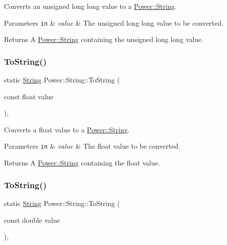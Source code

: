 Converts an unsigned long long value to a \hyperlink{class_power_1_1_string}{Power\+::\+String}. 


\begin{DoxyParams}[1]{Parameters}
\mbox{\tt in}  & {\em value} & The unsigned long long value to be converted. \\
\hline
\end{DoxyParams}
\begin{DoxyReturn}{Returns}
A \hyperlink{class_power_1_1_string}{Power\+::\+String} containing the unsigned long long value. 
\end{DoxyReturn}
\mbox{\label{class_power_1_1_string_aa9619926b7b1b5011b77cb164b232f61}} 
\subsubsection{\texorpdfstring{To\+String()}{ToString()}\hspace{0.1cm}{\footnotesize\ttfamily [10/11]}}
{\footnotesize\ttfamily static \hyperlink{class_power_1_1_string}{String} Power\+::\+String\+::\+To\+String (\begin{DoxyParamCaption}\item[{const float}]{value }\end{DoxyParamCaption})\hspace{0.3cm}{\ttfamily [inline]}, {\ttfamily [static]}}



Converts a float value to a \hyperlink{class_power_1_1_string}{Power\+::\+String}. 


\begin{DoxyParams}[1]{Parameters}
\mbox{\tt in}  & {\em value} & The float value to be converted. \\
\hline
\end{DoxyParams}
\begin{DoxyReturn}{Returns}
A \hyperlink{class_power_1_1_string}{Power\+::\+String} containing the float value. 
\end{DoxyReturn}
\mbox{\label{class_power_1_1_string_a00829800eb265360178fd8af3186ebaf}} 
\subsubsection{\texorpdfstring{To\+String()}{ToString()}\hspace{0.1cm}{\footnotesize\ttfamily [11/11]}}
{\footnotesize\ttfamily static \hyperlink{class_power_1_1_string}{String} Power\+::\+String\+::\+To\+String (\begin{DoxyParamCaption}\item[{const double}]{value }\end{DoxyParamCaption})\hspace{0.3cm}{\ttfamily [inline]}, {\ttfamily [static]}}



